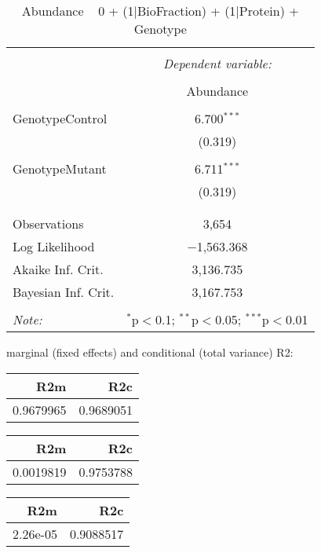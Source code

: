 \documentclass[11pt]{report}
\begin{document}
\begin{table}[!htbp] \centering 
  \caption{Abundance ~ 0 + (1|BioFraction) + (1|Protein) + Genotype} 
  \label{} 
\begin{tabular}{@{\extracolsep{5pt}}lc} 
\\[-1.8ex]\hline 
\hline \\[-1.8ex] 
 & \multicolumn{1}{c}{\textit{Dependent variable:}} \\ 
\cline{2-2} 
\\[-1.8ex] & Abundance \\ 
\hline \\[-1.8ex] 
 GenotypeControl & 6.700$^{***}$ \\ 
  & (0.319) \\ 
  & \\ 
 GenotypeMutant & 6.711$^{***}$ \\ 
  & (0.319) \\ 
  & \\ 
\hline \\[-1.8ex] 
Observations & 3,654 \\ 
Log Likelihood & $-$1,563.368 \\ 
Akaike Inf. Crit. & 3,136.735 \\ 
Bayesian Inf. Crit. & 3,167.753 \\ 
\hline 
\hline \\[-1.8ex] 
\textit{Note:}  & \multicolumn{1}{r}{$^{*}$p$<$0.1; $^{**}$p$<$0.05; $^{***}$p$<$0.01} \\ 
\end{tabular} 
\end{table} 
marginal (fixed effects) and conditional (total variance) R2:

\begin{tabular}{r|r}
\hline
R2m & R2c\\
\hline
0.9679965 & 0.9689051\\
\hline
\end{tabular}

\begin{tabular}{r|r}
\hline
R2m & R2c\\
\hline
0.0019819 & 0.9753788\\
\hline
\end{tabular}

\begin{tabular}{r|r}
\hline
R2m & R2c\\
\hline
2.26e-05 & 0.9088517\\
\hline
\end{tabular}
\end{document}
